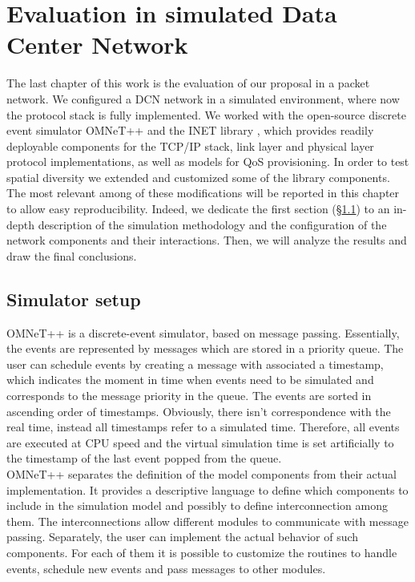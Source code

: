 \chapter{Evaluation in simulated Data Center Network}\label{ch4}
The last chapter of this work is the evaluation of our proposal in a packet network. We configured a DCN network in a simulated environment, where now the protocol stack is fully implemented. We worked with the open-source discrete event simulator OMNeT++ \cite{omnetpp} and the INET library \cite{inet}, which provides readily deployable components for the TCP/IP stack, link layer and physical layer protocol implementations, as well as models for QoS provisioning. In order to test spatial diversity we extended and customized some of the library components. The most relevant among of these modifications will be reported in this chapter to allow easy reproducibility. Indeed, we dedicate the first section (\S \ref{sec:opp-setup}) to an in-depth description of the simulation methodology and the configuration of the network components and their interactions. Then, we will analyze the results and draw the final conclusions. 
\section{Simulator setup}
\label{sec:opp-setup}
OMNeT++ is a discrete-event simulator, based on message passing. Essentially, the events are represented by messages which are stored in a priority queue. The user can schedule events by creating a message with associated a timestamp, which indicates the moment in time when events need to be simulated and corresponds to the message priority in the queue.  The events are sorted in ascending order of timestamps.  Obviously, there isn't correspondence with the real time, instead all timestamps refer to a simulated time. Therefore, all events are executed at CPU speed and the virtual simulation time is set artificially to the timestamp of the last event popped from the queue. \\ OMNeT++ separates the definition of the model components from their actual implementation. It provides a descriptive language to define which components to include in the simulation model and possibly to define interconnection among them. The interconnections allow different modules to communicate with message passing. Separately, the user can implement the actual behavior of such components. For each of them it is possible to customize the routines to handle events, schedule new events and pass messages to other modules.

